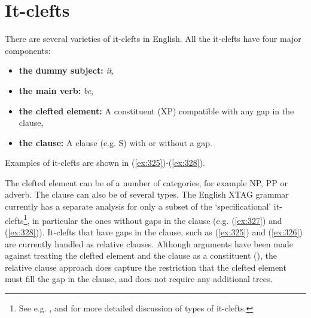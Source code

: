 \chapter{It-clefts} 
\label{it-clefts} 
 
There are several varieties of it-clefts in English.  All the 
it-clefts have four major components: 
 
\begin{itemize} 
\item {\bf the dummy subject:}  {\it it}, 
\item {\bf the main verb:}  {\it be}, 
\item {\bf the clefted element:}  A constituent (XP) compatible with 
any gap in the clause, 
\item {\bf the clause:}  A clause (e.g. S) with or without a gap. 
\end{itemize} 
 
\noindent 
Examples of it-clefts are shown in (\ref{ex:325})-(\ref{ex:328}). 
 
\beginsentences
{}\label{ex:325} 
\label{ex:326} 
\label{ex:327} 
\label{ex:328} 
\endsentences

 
The clefted element can be of a number of categories, for example NP, PP or 
adverb. The clause can also be of several types. The English XTAG grammar 
currently has a separate analysis for only a subset of the `specificational' 
it-clefts\footnote{See e.g. \cite{Ball91}, \cite{Delin89} and \cite{Delahunty84} for more detailed discussion of types of it-clefts.}, in particular the ones without gaps in the clause 
(e.g. (\ref{ex:327}) and (\ref{ex:328})).  It-clefts that have gaps in the clause, such 
as (\ref{ex:325}) and (\ref{ex:326}) are currently handled as relative clauses. Although 
arguments have been made against treating the clefted element and the clause as 
a constituent (\cite{Delahunty84}), the relative clause approach does capture 
the restriction that the clefted element must fill the gap in the clause, and 
does not require any additional trees. 
 
